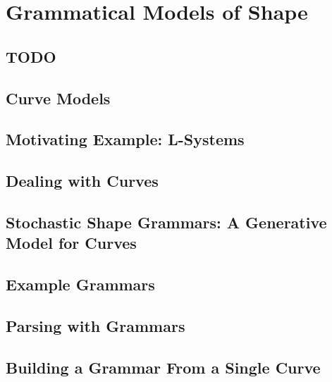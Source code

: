 \documentclass{book}
\begin{document}
\chapter{Grammatical Models of Shape}
  \label{chap-models}

  \section{TODO}
      

  \section{Curve Models}
    \label{sec-models-intro}
      

  \section{Motivating Example: L-Systems}
    \label{sec-models-lsystems}
    

  \section{Dealing with Curves}
    \label{sec-models-curves}
    

  \section{Stochastic Shape Grammars: A Generative Model for Curves}
    \label{sec-models-curvegrammars}
    

  \section{Example Grammars}
    \label{sec-models-examples}
    

  \section{Parsing with Grammars}
    \label{sec-models-parsing-em}
    

  \section{Building a Grammar From a Single Curve}
    \label{sec-models-singlecurve}
    
\end{document}
